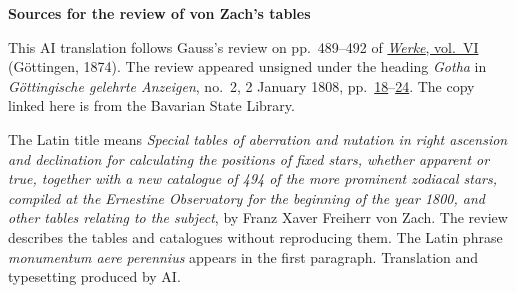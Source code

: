 \clearpage\thispagestyle{empty}
\begin{center}\textbf{Sources for the review of von Zach’s tables}\end{center}
\noindent This AI translation follows Gauss’s review on pp.~489--492 of \href{https://gdz.sub.uni-goettingen.de/id/PPN236007467}{\textit{Werke}, vol.~VI} (Göttingen, 1874). The review appeared unsigned under the heading \emph{Gotha} in \textit{Göttingische gelehrte Anzeigen}, no.~2, 2 January 1808, pp.~\href{https://api.digitale-sammlungen.de/iiif/image/v2/bsb10538673_00024/full/1800,/0/default.jpg}{18}--\href{https://api.digitale-sammlungen.de/iiif/image/v2/bsb10538673_00030/full/1800,/0/default.jpg}{24}. The copy linked here is from the Bavarian State Library.
\par\smallskip\noindent The Latin title means \emph{Special tables of aberration and nutation in right ascension and declination for calculating the positions of fixed stars, whether apparent or true, together with a new catalogue of 494 of the more prominent zodiacal stars, compiled at the Ernestine Observatory for the beginning of the year 1800, and other tables relating to the subject}, by Franz Xaver Freiherr von Zach. The review describes the tables and catalogues without reproducing them. The Latin phrase \emph{monumentum aere perennius} appears in the first paragraph. Translation and typesetting produced by AI.
\clearpage
